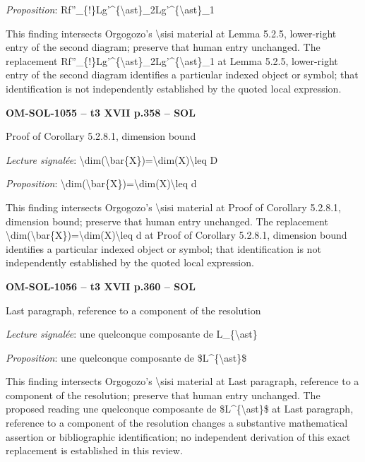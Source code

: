 \emph{Proposition}: Rf''\_\{!\}Lg'\textasciicircum{}\{\textbackslash{}ast\}\_2Lg'\textasciicircum{}\{\textbackslash{}ast\}\_1\par
This finding intersects Orgogozo's \textbackslash{}sisi material at Lemma 5.2.5, lower-right entry of the second diagram; preserve that human entry unchanged. The replacement Rf''\_\{!\}Lg'\textasciicircum{}\{\textbackslash{}ast\}\_2Lg'\textasciicircum{}\{\textbackslash{}ast\}\_1 at Lemma 5.2.5, lower-right entry of the second diagram identifies a particular indexed object or symbol; that identification is not independently established by the quoted local expression.\par
\par\noindent\textbf{OM-SOL-1055 -- t3 XVII p.358 -- SOL}\par
Proof of Corollary 5.2.8.1, dimension bound\par
\emph{Lecture signalée}: \textbackslash{}dim(\textbackslash{}bar\{X\})=\allowbreak \textbackslash{}dim(X)\textbackslash{}leq D\par
\emph{Proposition}: \textbackslash{}dim(\textbackslash{}bar\{X\})=\allowbreak \textbackslash{}dim(X)\textbackslash{}leq d\par
This finding intersects Orgogozo's \textbackslash{}sisi material at Proof of Corollary 5.2.8.1, dimension bound; preserve that human entry unchanged. The replacement \textbackslash{}dim(\textbackslash{}bar\{X\})=\allowbreak \textbackslash{}dim(X)\textbackslash{}leq d at Proof of Corollary 5.2.8.1, dimension bound identifies a particular indexed object or symbol; that identification is not independently established by the quoted local expression.\par
\par\noindent\textbf{OM-SOL-1056 -- t3 XVII p.360 -- SOL}\par
Last paragraph, reference to a component of the resolution\par
\emph{Lecture signalée}: une quelconque composante de L\_\{\textbackslash{}ast\}\par
\emph{Proposition}: une quelconque composante de \$L\textasciicircum{}\{\textbackslash{}ast\}\$\par
This finding intersects Orgogozo's \textbackslash{}sisi material at Last paragraph, reference to a component of the resolution; preserve that human entry unchanged. The proposed reading une quelconque composante de \$L\textasciicircum{}\{\textbackslash{}ast\}\$ at Last paragraph, reference to a component of the resolution changes a substantive mathematical assertion or bibliographic identification; no independent derivation of this exact replacement is established in this review.\par
